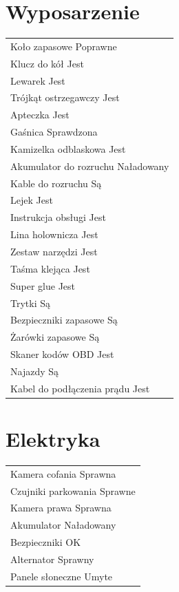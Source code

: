 \documentclass{article}
\begin{document}
\begin{multicols}{2}
\section{Wyposarzenie}
\begin{tabularx}{\columnwidth}{|X|}
\hline
Koło zapasowe \dotfill Poprawne \\
Klucz do kół \dotfill Jest \\
Lewarek \dotfill Jest \\
Trójkąt ostrzegawczy \dotfill Jest \\
Apteczka \dotfill Jest \\
Gaśnica \dotfill Sprawdzona \\
Kamizelka odblaskowa \dotfill Jest \\
Akumulator do rozruchu \dotfill Naładowany \\
Kable do rozruchu \dotfill Są \\
Lejek \dotfill Jest \\
Instrukcja obsługi \dotfill Jest \\
Lina holownicza \dotfill Jest \\
Zestaw narzędzi \dotfill Jest \\
Taśma klejąca \dotfill Jest \\
Super glue \dotfill Jest \\
Trytki \dotfill Są \\
Bezpieczniki zapasowe \dotfill Są \\
Żarówki zapasowe \dotfill Są \\
Skaner kodów OBD \dotfill Jest \\
Najazdy \dotfill Są \\
Kabel do podłączenia prądu \dotfill Jest \\
\hline
\end{tabularx}

\section{Elektryka}
\begin{tabularx}{\columnwidth}{|X|}
\hline
Kamera cofania \dotfill Sprawna \\
Czujniki parkowania \dotfill Sprawne \\
Kamera prawa \dotfill Sprawna \\
Akumulator \dotfill Naładowany \\
Bezpieczniki \dotfill OK \\
Alternator \dotfill Sprawny \\
Panele słoneczne \dotfill Umyte \\
\hline
\end{tabularx}


\end{multicols}
\end{document}
